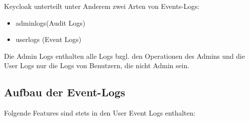 \documentclass[a4paper,12pt]{article}
\begin{document}
	Keycloak unterteilt unter Anderem zwei Arten von Events-Logs:
	
	\begin{itemize}
		\item \gls{adminlogs}(Audit Logs)
		\item \gls{userlogs} (Event Logs)
	\end{itemize}
	
	Die Admin Logs enthalten alle Logs bzgl. den Operationen des Admins und die User Logs nur die Logs von Benutzern, die nicht Admin sein.
	
	\subsection{Aufbau der Event-Logs}
	Folgende Features sind stets in den User Event Logs enthalten:
	
\end{document}
